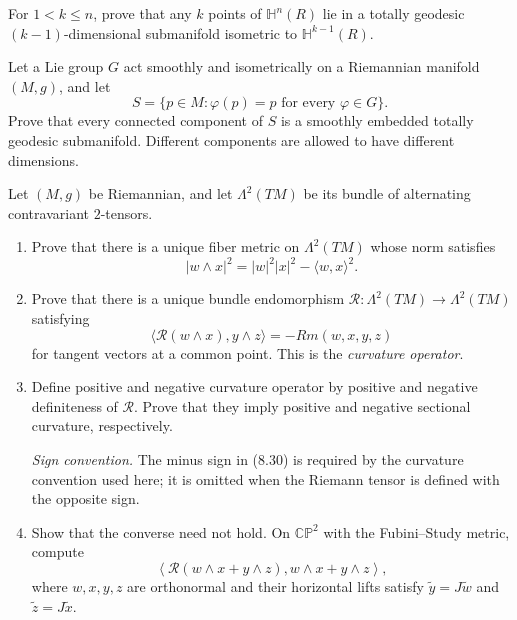 \begin{exercise}
\label{prob:k-points-hyperbolic-geodesic}

For $1<k\leq n$, prove that any $k$ points of $\mathbb H^n(R)$ lie in a
totally geodesic $(k-1)$-dimensional submanifold isometric to
$\mathbb H^{k-1}(R)$.
\end{exercise}

\begin{exercise}
\label{prob:lie-group-fixed-point-geodesic}

Let a Lie group $G$ act smoothly and isometrically on a Riemannian manifold
$(M,g)$, and let
\[
S=\{p\in M:\varphi(p)=p\text{ for every }\varphi\in G\}.
\]
Prove that every connected component of $S$ is a smoothly embedded totally
geodesic submanifold. Different components are allowed to have different
dimensions.
\end{exercise}

\begin{exercise}
\label{prob:curvature-operator}

Let $(M,g)$ be Riemannian, and let $\Lambda^2(TM)$ be its bundle of
alternating contravariant $2$-tensors.
\begin{enumerate}
\item[(a)] Prove that there is a unique fiber metric on $\Lambda^2(TM)$ whose
norm satisfies
\[
|w\wedge x|^2=|w|^2|x|^2-\langle w,x\rangle^2.
\]
\item[(b)] Prove that there is a unique bundle endomorphism
$\mathcal R:\Lambda^2(TM)\to\Lambda^2(TM)$ satisfying
\begin{equation}
\langle\mathcal R(w\wedge x),y\wedge z\rangle=-Rm(w,x,y,z)
\tag{8.30}
\end{equation}
for tangent vectors at a common point. This is the \emph{curvature operator}.
\item[(c)] Define positive and negative curvature operator by positive and
negative definiteness of $\mathcal R$. Prove that they imply positive and
negative sectional curvature, respectively.

\emph{Sign convention.} The minus sign in (8.30) is required by the curvature
convention used here; it is omitted when the Riemann tensor is defined with
the opposite sign.
\item[(d)] Show that the converse need not hold. On
$\mathbb{CP}^2$ with the Fubini--Study metric, compute
\[
\left\langle
\mathcal R(w\wedge x+y\wedge z),w\wedge x+y\wedge z
\right\rangle,
\]
where $w,x,y,z$ are orthonormal and their horizontal lifts satisfy
$\widetilde y=J\widetilde w$ and $\widetilde z=J\widetilde x$.
\end{enumerate}
\end{exercise}
